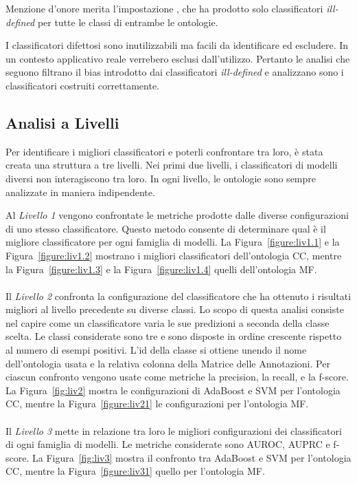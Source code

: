 \documentclass[12pt,a4paper,oneside,hidelinks]{report}
\begin{document}
Menzione d'onore merita l'impostazione , che ha prodotto solo classificatori \emph{ill-defined} per tutte le classi di entrambe le ontologie.

I classificatori difettosi sono inutilizzabili ma facili da identificare ed escludere. In un contesto applicativo reale verrebero esclusi dall'utilizzo. Pertanto le analisi che seguono filtrano il bias introdotto dai classificatori \emph{ill-defined} e analizzano sono i classificatori costruiti correttamente.

\subsection{Analisi a Livelli}
Per identificare i migliori classificatori e poterli confrontare tra loro, è stata creata una struttura a tre livelli. Nei primi due livelli, i classificatori di modelli diversi non interagiscono tra loro. In ogni livello, le ontologie sono sempre analizzate in maniera indipendente. 

Al \textit{Livello 1} vengono confrontate le metriche prodotte dalle diverse configurazioni di uno stesso classificatore. Questo metodo consente di determinare qual è il migliore classificatore per ogni famiglia di modelli. La Figura~\ref{figure:liv1.1} e la Figura~\ref{figure:liv1.2} mostrano i migliori classificatori dell'ontologia CC, mentre la Figura~\ref{figure:liv1.3} e la Figura~\ref{figure:liv1.4} quelli dell'ontologia MF.

\paragraph*{}
Il \textit{Livello 2} confronta la configurazione del classificatore che ha ottenuto i risultati migliori al livello precedente su diverse classi. Lo scopo di questa analisi consiste nel capire come un classificatore varia le sue predizioni a seconda della classe scelta. Le classi considerate sono tre e sono disposte in ordine crescente rispetto al numero di esempi positivi. L'id della classe si ottiene unendo il nome dell'ontologia usata e la relativa colonna della Matrice delle Annotazioni.
Per ciascun confronto vengono usate come metriche la precision, la recall, e la f-score.
La Figura~\ref{fig:liv2} mostra le configurazioni di AdaBoost e SVM per l'ontologia CC, mentre la Figura~\ref{figure:liv21} le configurazioni per l'ontologia MF.

\paragraph*{}
Il \textit{Livello 3} mette in relazione tra loro le migliori configurazioni dei classificatori di ogni famiglia di modelli. Le metriche considerate sono AUROC, AUPRC e f-score. La Figura~\ref{fig:liv3} mostra il confronto tra AdaBoost e SVM per l'ontologia CC, mentre la Figura~\ref{figure:liv31} quello per l'ontologia MF.
\end{document}
